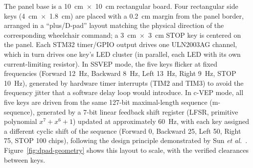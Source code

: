 \documentclass[11pt]{article}
\begin{document}
The panel base is a 10~cm~$\times$~10~cm rectangular board. Four rectangular side keys (4~cm~$\times$~1.8~cm) are placed with a 0.2~cm margin from the panel border, arranged in a ``plus/D-pad'' layout matching the physical direction of the corresponding wheelchair command; a 3~cm~$\times$~3~cm STOP key is centered on the panel. Each STM32 timer/GPIO output drives one ULN2003AG channel, which in turn drives one key's LED cluster (in parallel, each LED with its own current-limiting resistor). In SSVEP mode, the five keys flicker at fixed frequencies (Forward 12~Hz, Backward 8~Hz, Left 13~Hz, Right 9~Hz, STOP 10~Hz), generated by hardware timer interrupts (TIM2 and TIM3) to avoid the frequency jitter that a software delay loop would introduce. In c-VEP mode, all five keys are driven from the same 127-bit maximal-length sequence (m-sequence), generated by a 7-bit linear feedback shift register (LFSR, primitive polynomial $x^7+x^6+1$) updated at approximately 60~Hz, with each key assigned a different cyclic shift of the sequence (Forward 0, Backward 25, Left 50, Right 75, STOP 100 chips), following the design principle demonstrated by Sun \textit{et al.}~\cite{sun2022cyclicshift}. Figure~\ref{fig:dpad-geometry} shows this layout to scale, with the verified clearances between keys.
\end{document}
